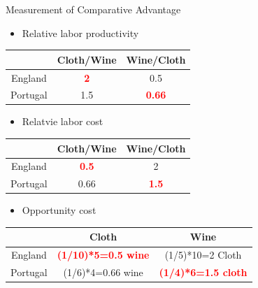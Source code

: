 \documentclass[10pt,hyperref={CJKbookmarks=true},xcolor=dvipsnames,aspectratio=169]{beamer}
\begin{document}
\begin{frame}{Measurement of Comparative Advantage}

\begin{itemize}
\item Relative labor productivity
\end{itemize}

\pause{}


\begin{center}
\begin{tabular}{|c|c|c|}
\hline 
& Cloth/Wine & Wine/Cloth\tabularnewline
\hline 
\hline 
England & \textbf{\textcolor{red}{2}} & 0.5\tabularnewline
\hline 
Portugal & 1.5 & \textbf{\textcolor{red}{0.66}}\tabularnewline
\hline 
\end{tabular}
\par\end{center}
\begin{itemize}
\item Relatvie labor cost
\end{itemize}

\pause{}


\begin{center}
\begin{tabular}{|c|c|c|}
\hline 
& Cloth/Wine & Wine/Cloth\tabularnewline
\hline 
\hline 
England & \textbf{\textcolor{red}{0.5}} & 2\tabularnewline
\hline 
Portugal & 0.66 & \textbf{\textcolor{red}{1.5}}\tabularnewline
\hline 
\end{tabular}
\par\end{center}
\begin{itemize}
\item Opportunity cost
\end{itemize}

\pause{}


\begin{center}
\begin{tabular}{|c|c|c|}
\hline 
& Cloth & Wine\tabularnewline
\hline 
\hline 
England & \textbf{\textcolor{red}{(1/10){*}5=0.5 wine}} & (1/5){*}10=2 Cloth\tabularnewline
\hline 
Portugal & (1/6){*}4=0.66 wine & \textbf{\textcolor{red}{(1/4){*}6=1.5 cloth}}\tabularnewline
\hline 
\end{tabular}
\par\end{center}


\end{frame}
\end{document}
